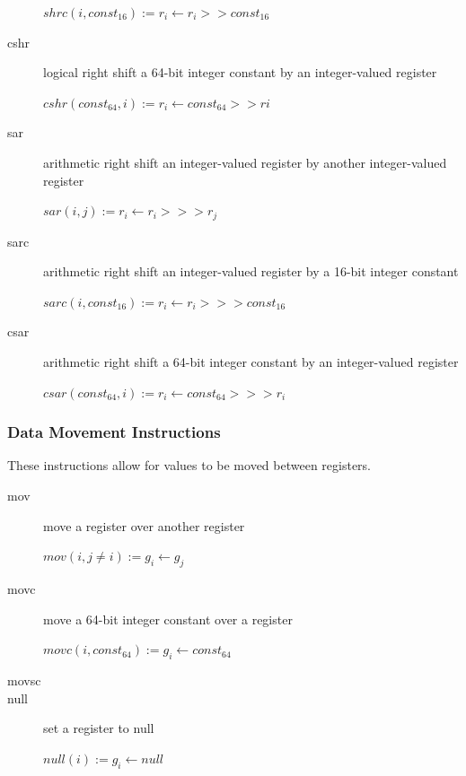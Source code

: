 \documentclass[english,a4paper]{article}
\begin{document}
\begin{description}
  $shrc(i, const _{16}) :=  r _{i} \longleftarrow  r _{i} >> const _{16} $ \\
\item[cshr] logical right shift a 64-bit integer constant by an
  integer-valued register
  
  $cshr(const _{64}, i):=  r _{i} \longleftarrow  const _{64} >> r{i}  $  \\
\item[sar] arithmetic right shift an integer-valued register by
  another integer-valued register
  
  $sar(i, j) :=  r _{i} \longleftarrow  r _{i} >>> r _{j} $  \\
\item[sarc] arithmetic right shift an integer-valued register by a
  16-bit integer constant
  
  $sarc(i, const _{16}) :=  r _{i} \longleftarrow  r _{i} >>> const _{16} $ \\
\item[csar] arithmetic right shift a 64-bit integer constant by an
  integer-valued register
  
  $csar(const _{64}, i):=  r _{i} \longleftarrow  const _{64} >>> r _{i}  $ \\
\end{description}

\subsubsection{Data Movement Instructions}
These instructions allow for values to be moved between registers.

\begin{description}
\item[mov] move a register over another register
  
  $mov(i, j \neq i) := g_{i} \longleftarrow g_{j} $ \\
\item[movc] move a 64-bit integer constant over a register
  
  $movc(i, const_{64}):= g_{i} \longleftarrow const_{64} $ \\

\item[movsc]

\item[null] set a register to null
  
  $null(i):= g_{i} \longleftarrow null $ \\
\end{description}
\end{document}

